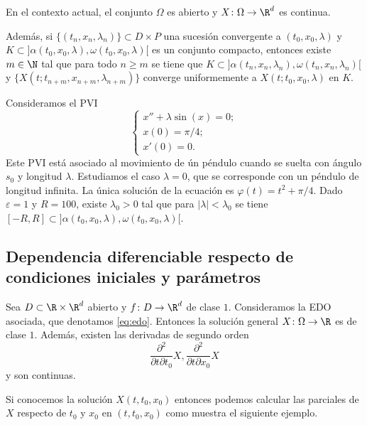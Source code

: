 \begin{theorem}
  \label{thm:cuc-parametros}
  En el contexto actual, el conjunto $\Omega$ es abierto y $X \colon \Omega \to \R^d$ es continua.

  Además, si $\{(t_n, x_n, \lambda_n)\} \subset D \times P$ una sucesión convergente a
  $(t_0, x_0, \lambda)$ y $K \subset ]\alpha(t_0,x_0,\lambda), \omega(t_0, x_0, \lambda)[$ es un conjunto compacto,
  entonces existe $m \in \N$ tal que para todo $n \ge m$ se tiene que
  $K \subset ]\alpha(t_n,x_n,\lambda_n), \omega(t_n, x_n, \lambda_n)[$ y
  $\{X(t; t_{n+m}, x_{n+m}, \lambda_{n+m})\}$ converge uniformemente a $X(t; t_0, x_0, \lambda)$ en
  $K$.
\end{theorem}

\begin{ex}
  Consideramos el PVI
  \[
    \begin{cases}
      x'' + \lambda \sin(x) = 0; \\
      x(0) = \pi / 4; \\
      x'(0) = 0.
    \end{cases}
  \]
  Este PVI está asociado al movimiento de ún péndulo cuando se suelta con ángulo $s_0$ y longitud
  $\lambda$. Estudiamos el caso $\lambda = 0$, que se corresponde con un péndulo de longitud
  infinita. La única solución de la ecuación es $\varphi(t) = t^2 + \pi/4$. Dado $\varepsilon = 1$ y
  $R = 100$, existe $\lambda_0 >0$ tal que para $|\lambda| < \lambda_0$ se tiene
  $[-R,R] \subset ]\alpha(t_0,x_0,\lambda), \omega(t_0, x_0, \lambda)[$.
\end{ex}

\subsection{Dependencia diferenciable respecto de condiciones iniciales y parámetros}

\begin{theorem}
  Sea $D \subset \R \times \R^d$ abierto y $f \colon D \to \R^d$ de clase $1$. Consideramos la EDO
  asociada, que denotamos \eqref{eq:edo}. Entonces la solución general $X \colon \Omega \to \R$ es
  de clase $1$. Además, existen las derivadas de segundo orden
  \[\frac{\partial^2}{\partial t \partial t_0} X, \frac{\partial^2}{\partial t \partial x_0} X\]
  y son continuas.
\end{theorem}

Si conocemos la solución $X(t, t_0, x_0)$ entonces podemos calcular las parciales de $X$ respecto de
$t_0$ y $x_0$ en $(t,t_0, x_0)$ como muestra el siguiente ejemplo.


